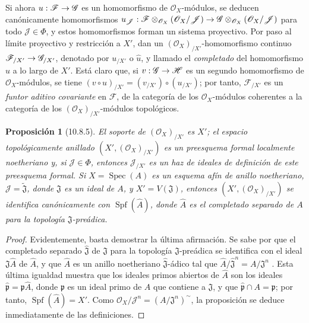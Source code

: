 \documentclass[oneside]{amsart}
\theoremstyle{ega-env-style}
\theoremstyle{ega-thm-env-style}
\newtheorem*{proposition}{Proposición}
\theoremstyle{ega-defn-env-style}
\renewcommand{\to}{\mathchoice{\longrightarrow}{\rightarrow}{\rightarrow}{\rightarrow}}
\let\EGAOriginalLabel\label
\renewcommand{\label}[1]{\phantomsection\EGAOriginalLabel{#1}}
\begin{document}
Si ahora $u:\mathscr{F}\to\mathscr{G}$ es un homomorfismo de $\mathscr{O}_X$-módulos, se deducen canónicamente homomorfismos $u_{\mathscr{J}}:
\mathscr{F}\otimes_{\mathscr{O}_X}(\mathscr{O}_X/\mathscr{J})
\to
\mathscr{G}\otimes_{\mathscr{O}_X}(\mathscr{O}_X/\mathscr{J})$ para todo $\mathscr{J}\in\Phi$, y estos homomorfismos forman un sistema proyectivo.
Por paso al límite proyectivo y restricción a $X'$, dan un $(\mathscr{O}_X)_{/X'}$-homomorfismo continuo $\mathscr{F}_{/X'}\to\mathscr{G}_{/X'}$, denotado por $u_{/X'}$ o $\widehat u$, y llamado el \emph{completado} del homomorfismo $u$ a lo largo de $X'$.
Está claro que, si $v:\mathscr{G}\to\mathscr{H}$ es un segundo homomorfismo de $\mathscr{O}_X$-módulos, se tiene $(v\circ u)_{/X'}=(v_{/X'})\circ(u_{/X'})$; por tanto, $\mathscr{F}_{/X'}$ es un \emph{funtor aditivo covariante} en $\mathscr{F}$, de la categoría de los $\mathscr{O}_X$-módulos coherentes a la categoría de los $(\mathscr{O}_X)_{/X'}$-módulos topológicos.

\begin{proposition}[10.8.5]
\label{I.10.8.5}
El soporte de $(\mathscr{O}_X)_{/X'}$ es $X'$; el espacio topológicamente anillado $(X',(\mathscr{O}_X)_{/X'})$ es un preesquema formal localmente noetheriano y, si $\mathscr{J}\in\Phi$, entonces $\mathscr{J}_{/X'}$ es un haz de ideales de definición de este preesquema formal.
Si $X=\operatorname{Spec}(A)$ es un esquema afín de anillo noetheriano, $\mathscr{J}=\widetilde{\mathfrak{J}}$, donde $\mathfrak{J}$ es un ideal de $A$, y $X'=V(\mathfrak{J})$, entonces $(X',(\mathscr{O}_X)_{/X'})$ se identifica canónicamente con $\operatorname{Spf}(\widehat A)$, donde $\widehat A$ es el completado separado de $A$ para la topología $\mathfrak{J}$-preádica.
\end{proposition}

\begin{proof}
Evidentemente, basta demostrar la última afirmación.
Se sabe por  que el completado separado $\widehat{\mathfrak{J}}$ de $\mathfrak{J}$ para la topología $\mathfrak{J}$-preádica se identifica con el ideal $\mathfrak{J}\widehat A$ de $\widehat A$, y que $\widehat A$ es un anillo noetheriano $\widehat{\mathfrak{J}}$-ádico tal que $\widehat A/\widehat{\mathfrak{J}}^n=A/\mathfrak{J}^n$ .
Esta última igualdad muestra que los ideales primos abiertos de $\widehat A$ son los ideales $\widehat{\mathfrak p}=\mathfrak p\widehat A$, donde $\mathfrak p$ es un ideal primo de $A$ que contiene a $\mathfrak{J}$, y que $\widehat{\mathfrak p}\cap A=\mathfrak p$; por tanto, $\operatorname{Spf}(\widehat A)=X'$.
Como $\mathscr{O}_X/\mathscr{J}^n=(A/\mathfrak{J}^n)^{\sim}$, la proposición se deduce inmediatamente de las definiciones.
\end{proof}
\end{document}
